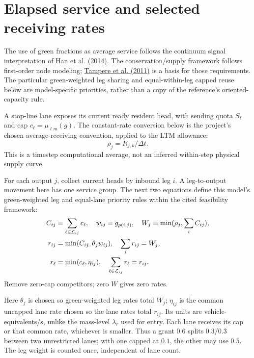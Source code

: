 \documentclass[10pt,a4paper]{article}
\newcommand{\rev}[1]{{\color{revisionred}#1}}
\begin{document}
\section{Elapsed service and selected receiving rates}


The use of green fractions as average service follows the continuum
signal interpretation of
\href{https://arxiv.org/abs/1309.3461}{Han et al. (2014)}.
The conservation/supply framework follows first-order node modeling;
\href{https://doi.org/10.1016/j.trb.2010.06.004}{Tampere et al. (2011)}
is a basis for those requirements. The particular green-weighted leg
sharing and equal-within-leg capped reuse below are model-specific
priorities, rather than a copy of the reference's oriented-capacity rule.
\par

A stop-line lane exposes its current ready resident head, with sending
quota $S_\ell$ and cap $c_\ell=\mu_{\ell m}(g)$.
\rev{The constant-rate conversion below is the project's chosen average-receiving convention, applied to the LTM allowance:}
\begin{equation}
 \rho_j=R_{j,k}/\Delta t .
 \label{eq:receiving-rate}
\end{equation}
This is a timestep computational average, not an inferred within-step
physical supply curve.

For each output $j$, collect current heads by inbound leg $i$.
A leg-to-output movement here has one service group.
\rev{The next two equations define this model's green-weighted leg and equal-lane priority rules within the cited feasibility framework:}
\begin{align}
 C_{ij}&=\sum_{\ell\in{\cal L}_{ij}}c_\ell,\quad
 w_{ij}=g_{p(i,j)},\quad W_j=\min(\rho_j,\sum_iC_{ij}),\nonumber\\
 r_{ij}&=\min(C_{ij},\theta_jw_{ij}),\quad
                    \sum_i r_{ij}=W_j,\label{eq:leg-sharing}\\
 r_\ell&=\min(c_\ell,\eta_{ij}),\quad
                    \sum_{\ell\in{\cal L}_{ij}}r_\ell=r_{ij}.
 \label{eq:lane-sharing}
\end{align}
Remove zero-cap competitors; zero $W$ gives zero rates.

Here $\theta_j$ is chosen so green-weighted leg rates total $W_j$;
$\eta_{ij}$ is the common uncapped lane rate chosen so the lane rates
total $r_{ij}$. Its units are vehicle-equivalents/s, unlike the mass-level
$\lambda_r$ used for entry. Each lane receives its cap or that common
rate, whichever is smaller. Thus a grant $0.6$ splits $0.3/0.3$ between
two unrestricted lanes; with one capped at $0.1$, the other may use $0.5$.
The leg weight is counted once, independent of lane count.
\par
\end{document}

